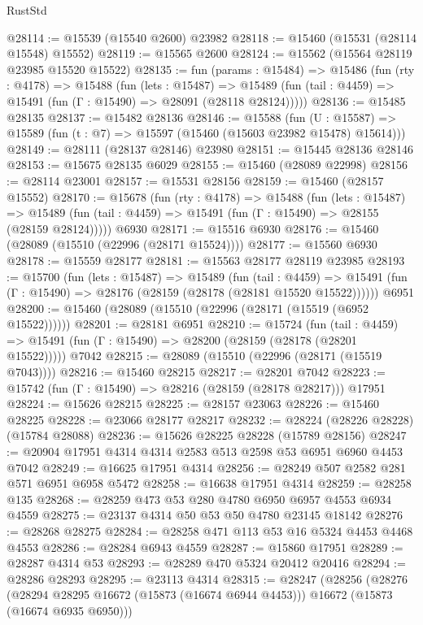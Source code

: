 \begin{lexlean}{RustStd}
\begin{coremodule}
@28114 := @15539 (@15540 @2600) @23982
@28118 := @15460 (@15531 (@28114 @15548) @15552)
@28119 := @15565 @2600
@28124 := @15562 (@15564 @28119 @23985 @15520 @15522)
@28135 := fun (params : @15484) =>
  @15486
    (fun (rty : @4178) =>
    @15488
      (fun (lets : @15487) =>
      @15489 (fun (tail : @4459) => @15491 (fun (Γ : @15490) => @28091 (@28118 @28124)))))
@28136 := @15485 @28135
@28137 := @15482 @28136
@28146 := @15588
    (fun (U : @15587) => @15589 (fun (t : @7) => @15597 (@15460 (@15603 @23982 @15478) @15614)))
@28149 := @28111 (@28137 @28146) @23980
@28151 := @15445 @28136 @28146
@28153 := @15675 @28135 @6029
@28155 := @15460 (@28089 @22998)
@28156 := @28114 @23001
@28157 := @15531 @28156
@28159 := @15460 (@28157 @15552)
@28170 := @15678
    (fun (rty : @4178) =>
    @15488
      (fun (lets : @15487) =>
      @15489 (fun (tail : @4459) => @15491 (fun (Γ : @15490) => @28155 (@28159 @28124)))))
    @6930
@28171 := @15516 @6930
@28176 := @15460 (@28089 (@15510 (@22996 (@28171 @15524))))
@28177 := @15560 @6930
@28178 := @15559 @28177
@28181 := @15563 @28177 @28119 @23985
@28193 := @15700
    (fun (lets : @15487) =>
    @15489
      (fun (tail : @4459) =>
      @15491 (fun (Γ : @15490) => @28176 (@28159 (@28178 (@28181 @15520 @15522))))))
    @6951
@28200 := @15460 (@28089 (@15510 (@22996 (@28171 (@15519 (@6952 @15522))))))
@28201 := @28181 @6951
@28210 := @15724
    (fun (tail : @4459) => @15491 (fun (Γ : @15490) => @28200 (@28159 (@28178 (@28201 @15522)))))
    @7042
@28215 := @28089 (@15510 (@22996 (@28171 (@15519 @7043))))
@28216 := @15460 @28215
@28217 := @28201 @7042
@28223 := @15742 (fun (Γ : @15490) => @28216 (@28159 (@28178 @28217))) @17951
@28224 := @15626 @28215
@28225 := @28157 @23063
@28226 := @15460 @28225
@28228 := @23066 @28177 @28217
@28232 := @28224 (@28226 @28228) (@15784 @28088)
@28236 := @15626 @28225 @28228 (@15789 @28156)
@28247 := @20904 @17951 @4314 @4314 @2583 @513 @2598 @53 @6951 @6960 @4453 @7042
@28249 := @16625 @17951 @4314
@28256 := @28249 @507 @2582 @281 @571 @6951 @6958 @5472
@28258 := @16638 @17951 @4314
@28259 := @28258 @135
@28268 := @28259 @473 @53 @280 @4780 @6950 @6957 @4553 @6934 @4559
@28275 := @23137 @4314 @50 @53 @50 @4780 @23145 @18142
@28276 := @28268 @28275
@28284 := @28258 @471 @113 @53 @16 @5324 @4453 @4468 @4553
@28286 := @28284 @6943 @4559
@28287 := @15860 @17951
@28289 := @28287 @4314 @53
@28293 := @28289 @470 @5324 @20412 @20416
@28294 := @28286 @28293
@28295 := @23113 @4314
@28315 := @28247
    (@28256
      (@28276
        (@28294 @28295 @16672 (@15873 (@16674 @6944 @4453)))
        @16672
        (@15873 (@16674 @6935 @6950)))

\end{coremodule}
\end{lexlean}
